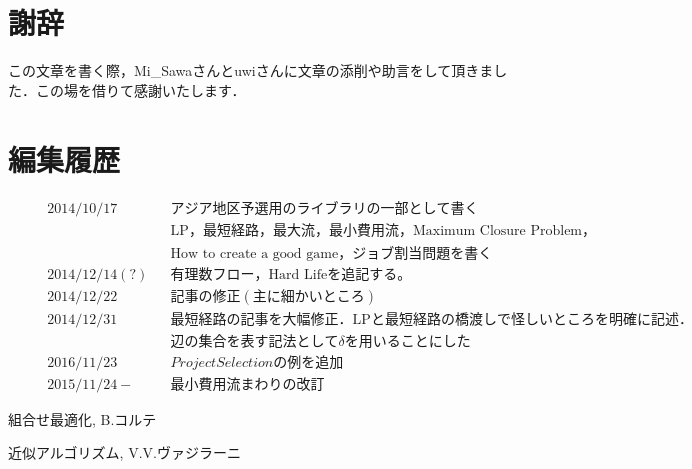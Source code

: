 \documentclass[13pt]{jarticle}
\theoremstyle{nonitalic} %
\begin{document}
\section*{謝辞}
この文章を書く際，Mi\_Sawaさんとuwiさんに文章の添削や助言をして頂きました．この場を借りて感謝いたします．

\section*{編集履歴}
\begin{align*}
  &&& 2014/10/17 && アジア地区予選用のライブラリの一部として書く &&&\\
  &&&            && \mathrm{LP}， 最短経路， 最大流， 最小費用流， \textrm{Maximum Closure Problem}， \\
  &&&            &&\textrm{How to create a good game}， ジョブ割当問題を書く \\
  &&& 2014/12/14(?) && 有理数フロー， \textrm{Hard Life}を追記する。 \\
  &&& 2014/12/22    && 記事の修正(主に細かいところ)\\
  &&& 2014/12/31    && 最短経路の記事を大幅修正．\textrm{LP}と最短経路の橋渡しで怪しいところを明確に記述．\\
  &&&               && 辺の集合を表す記法として \delta を用いることにした\\
  &&& 2016/11/23 && Project Selectionの例を追加　\\
  &&& 2015/11/24- && 最小費用流まわりの改訂
\end{align*}

\begin{thebibliography}{99}
 組合せ最適化, B.コルテ

 近似アルゴリズム, V.V.ヴァジラーニ


\end{thebibliography}
\end{document}
